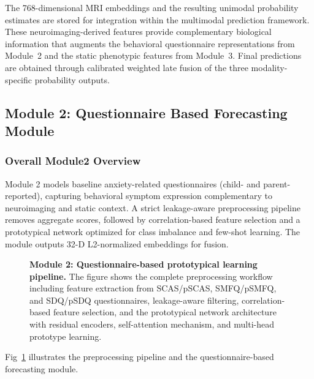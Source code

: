 \documentclass[10pt,letterpaper]{article}
\begin{document}
The 768-dimensional MRI embeddings and the resulting unimodal probability estimates are stored for integration within the multimodal prediction framework. These neuroimaging-derived features provide complementary biological information that augments the behavioral questionnaire representations from Module~2 and the static phenotypic features from Module~3. Final predictions are obtained through calibrated weighted late fusion of the three modality-specific probability outputs.

\subsection*{Module 2: Questionnaire Based Forecasting Module}

\subsubsection*{\textbf{Overall Module2 Overview}}
Module 2 models baseline anxiety-related questionnaires (child- and parent-reported), capturing behavioral symptom expression complementary to neuroimaging and static context. A strict leakage-aware preprocessing pipeline removes aggregate scores, followed by correlation-based feature selection and a prototypical network optimized for class imbalance and few-shot learning. The module outputs 32-D L2-normalized embeddings for fusion. 

\begin{figure}[!h]
\caption{\textbf{Module 2: Questionnaire-based prototypical learning pipeline.}
The figure shows the complete preprocessing workflow including feature extraction from SCAS/pSCAS, SMFQ/pSMFQ, and SDQ/pSDQ questionnaires, leakage-aware filtering, correlation-based feature selection, and the prototypical network architecture with residual encoders, self-attention mechanism, and multi-head prototype learning.}
\label{fig:module2}
\end{figure}

Fig~\ref{fig:module2} illustrates the preprocessing pipeline and the questionnaire-based forecasting module.
\end{document}
